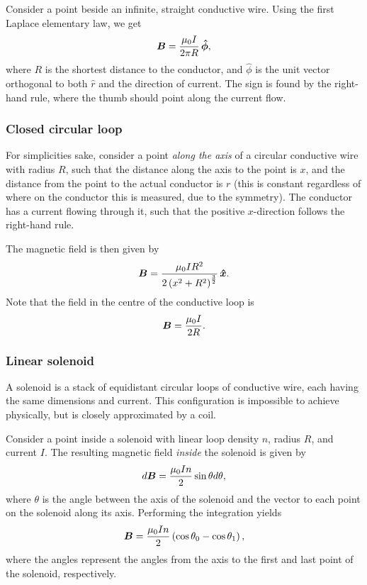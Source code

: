         Consider a point beside an infinite, straight conductive wire. Using the first Laplace elementary law, we get 
        \begin{equation}
            \B = \frac{\mu_0 I}{2\pi R}\,\hat{\phi},
        \end{equation}
        where $R$ is the shortest distance to the conductor, 
        and $\hat{\phi}$ is the  unit vector orthogonal to both $\hat{r}$ and the direction of current.
        The sign is found by the right-hand rule, where the thumb should point along the current flow.
        
    \subsubsection{Closed circular loop}
        For simplicities sake, consider a point \textit{along the axis} of a circular conductive wire with radius $R$, 
        such that the distance along the axis to the point is $x$, 
        and the distance from the point to the actual conductor is $r$ 
        (this is constant regardless of where on the conductor this is measured, due to the symmetry).
        The conductor has a current flowing through it, such that the positive $x$-direction follows the right-hand rule. 

        The magnetic field is then given by
        \begin{equation}
            \B = \frac{\mu_0 I R^2}{2 \left(x^2 + R^2\right)^\frac{3}{2}}\,\hat{x}.
        \end{equation}
        Note that the field in the centre of the conductive loop is
        \begin{equation}
            \bm{B} = \frac{\mu_0 I}{2R}.
        \end{equation}
    
    \subsubsection{Linear solenoid}
        A solenoid is a stack of equidistant circular loops of conductive wire, each having the same dimensions and current. 
        This configuration is impossible to achieve physically, but is closely approximated by a coil. 

        Consider a point inside a solenoid with linear loop density $n$, radius $R$, and current $I$. 
        The resulting magnetic field \textit{inside} the solenoid is given by
        \begin{equation}
            d\bm{B} = \frac{\mu_0 I n}{2}\sin\theta d\theta,
        \end{equation}
        where $\theta$ is the angle between the axis of the solenoid and the vector to each point on the solenoid along its axis.
        Performing the integration yields
        \begin{equation}
            \bm{B} = \frac{\mu_0 In}{2}\left(\cos\theta_0 - \cos\theta_1\right),
        \end{equation}
        where the angles represent the angles from the axis to the first and last point of the solenoid, respectively. 

